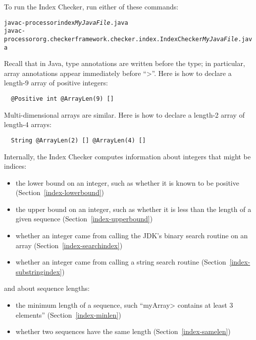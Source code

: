 To run the Index Checker, run either of these commands:

\begin{alltt}
  javac -processor index \emph{MyJavaFile}.java
  javac -processor org.checkerframework.checker.index.IndexChecker \emph{MyJavaFile}.java
\end{alltt}

Recall that in Java, type annotations are written before the type;
in particular,
array annotations appear immediately before ``\<[]>''.
Here is how to declare a length-9 array of positive integers:

\begin{Verbatim}
  @Positive int @ArrayLen(9) []
\end{Verbatim}

Multi-dimensional arrays are similar.
Here is how to declare a length-2 array of length-4 arrays:

\begin{Verbatim}
  String @ArrayLen(2) [] @ArrayLen(4) []
\end{Verbatim}



Internally, the Index Checker computes information about integers that
might be indices:
\begin{itemize}
\item
  the lower bound on an integer, such as whether it is known to be positive
  (Section~\ref{index-lowerbound})
\item
  the upper bound on an integer, such as whether it is less than the length
  of a given sequence (Section~\ref{index-upperbound})
\item
  whether an integer came from calling the JDK's binary search routine on
  an array (Section~\ref{index-searchindex})
\item
  whether an integer came from calling a string search routine
  (Section~\ref{index-substringindex})
\end{itemize}

\noindent
and about sequence lengths:
\begin{itemize}
\item
  the minimum length of a sequence, such ``\<myArray> contains at least 3
  elements'' (Section~\ref{index-minlen})
\item
  whether two sequences have the same length (Section~\ref{index-samelen})
\end{itemize}

